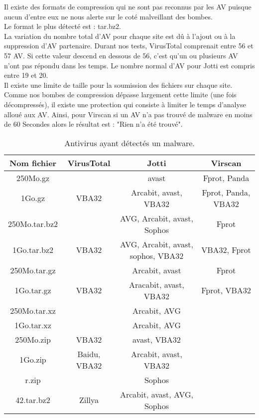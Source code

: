 \documentclass[smallextended]{svjour3}       %
\begin{document}
Il existe des formats de compression qui ne sont pas reconnus par les AV puisque aucun d'entre eux ne nous alerte sur le coté malveillant des bombes.\\
Le format le plus détecté est : tar.bz2.\\
La variation du nombre total d'AV pour chaque site est dû à l'ajout ou à la suppression d'AV partenaire. Durant nos tests, VirusTotal comprenait entre 56 et 57 AV. Si cette valeur descend en dessous de 56, c'est qu'un ou plusieurs AV n'ont pas répondu dans les temps. Le nombre normal d'AV pour Jotti est compris entre 19 et 20.\\
Il existe une limite de taille pour la soumission des fichiers sur chaque site. Comme nos bombes de compression dépasse largement cette limite (une fois décompressés), il existe une protection qui consiste à limiter le temps d'analyse alloué aux AV. Ainsi, pour Virscan si un AV n'a pas trouvé de malware en moins de 60 Secondes alors le résultat est : "Rien n'a été trouvé".
\begin{table}[ht!]
\begin{tabular}{|c|c|c|c|}
    \hline
     \textbf{Nom fichier} & \textbf{VirusTotal} & \textbf{Jotti} & \textbf{Virscan} \\
     \hline
    250Mo.gz &  & avast & Fprot, Panda\\
    \hline
    1Go.gz & VBA32 & Arcabit, avast, VBA32 & Fprot, Panda, VBA32\\
    \hline
    \hline
    250Mo.tar.bz2 & & AVG, Arcabit, avast, Sophos & Fprot\\
    \hline
    1Go.tar.bz2 & VBA32 & AVG, Arcabit, avast, sophos, VBA32 & VBA32, Fprot\\
    \hline
    \hline
    250Mo.tar.gz & & Arcabit, avast & Fprot\\
    \hline
    1Go.tar.gz & VBA32 & Aracabit, avast, VBA32 & Fprot, VBA32\\
    \hline
    \hline
    250Mo.tar.xz & & Arcabit, AVG & \\
    \hline
    1Go.tar.xz & & Arcabit, AVG & \\
    \hline
    \hline
    250Mo.zip & VBA32 & avast, VBA32 & \\
    \hline
    1Go.zip & Baidu, VBA32 & Arcabit, avast, VBA32 & \\
    \hline
    r.zip &  & Sophos  & \\
    \hline
    \hline
    42.tar.bz2 & Zillya & Arcabit, avast, AVG, Sophos  & \\
    \hline
\end{tabular}
\caption{Antivirus ayant détectés un malware.}
\end{table}
\end{document}
